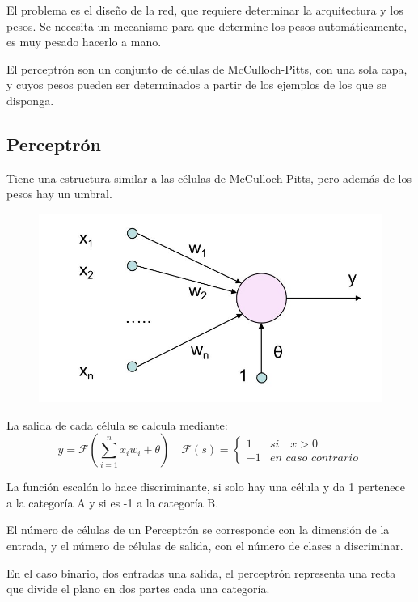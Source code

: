 \documentclass[12pt, twoside, openright]{report} %
\begin{document}
El problema es el diseño de la red, que requiere determinar la arquitectura y los pesos. Se necesita un mecanismo para que determine los pesos automáticamente, es muy pesado hacerlo a mano.

El perceptrón son un conjunto de células de McCulloch-Pitts, con una sola capa, y cuyos pesos pueden ser determinados a partir de los ejemplos de los que se disponga.
\pagebreak

\subsection{Perceptrón}
Tiene una estructura similar a las células de McCulloch-Pitts, pero además de los pesos hay un umbral.
\begin{figure}[H]
	{\includegraphics[scale=.35]{perceptron.jpg}}
\end{figure}

La salida de cada célula se calcula mediante:
$$y=\mathcal{F}\left(\sum_{i=1}^n x_i w_i+\theta\right) \quad \mathcal{F}(s) = \begin{cases}1 & \textit{si}\quad  x> 0\\-1 & \textit{en caso contrario}\end{cases}$$

La función escalón lo hace discriminante, si solo hay una célula y da 1 pertenece a la categoría A y si es -1 a la categoría B.

El número de células de un Perceptrón se corresponde con la dimensión de la entrada, y el número de células de salida, con el número de clases a discriminar.

En el caso binario, dos entradas una salida, el perceptrón representa una recta que divide el plano en dos partes cada una categoría.
\end{document}

